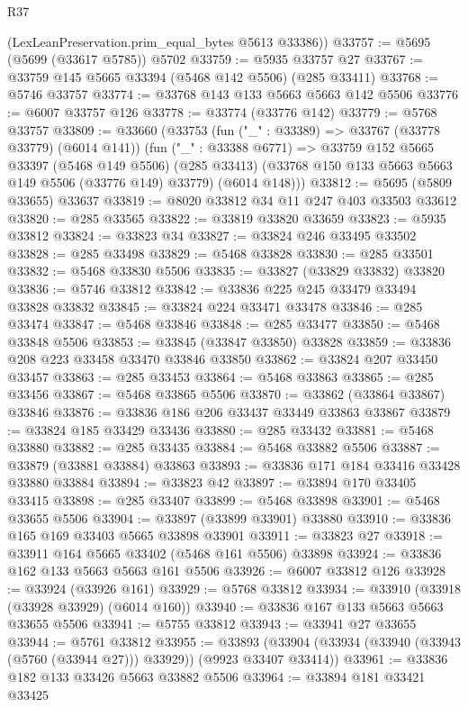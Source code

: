 \begin{lexlean}{R37}
\begin{coremodule}
      (LexLeanPreservation.prim_equal_bytes @5613 @33386))
@33757 := @5695 (@5699 (@33617 @5785)) @5702
@33759 := @5935 @33757 @27
@33767 := @33759 @145 @5665 @33394 (@5468 @142 @5506) (@285 @33411)
@33768 := @5746 @33757
@33774 := @33768 @143 @133 @5663 @5663 @142 @5506
@33776 := @6007 @33757 @126
@33778 := @33774 (@33776 @142)
@33779 := @5768 @33757
@33809 := @33660
    (@33753
      (fun ("_" : @33389) => @33767 (@33778 @33779) (@6014 @141))
      (fun ("_" : @33388 @6771) =>
      @33759
        @152
        @5665
        @33397
        (@5468 @149 @5506)
        (@285 @33413)
        (@33768 @150 @133 @5663 @5663 @149 @5506 (@33776 @149) @33779)
        (@6014 @148)))
@33812 := @5695 (@5809 @33655) @33637
@33819 := @8020 @33812 @34 @11 @247 @403 @33503 @33612
@33820 := @285 @33565
@33822 := @33819 @33820 @33659
@33823 := @5935 @33812
@33824 := @33823 @34
@33827 := @33824 @246 @33495 @33502
@33828 := @285 @33498
@33829 := @5468 @33828
@33830 := @285 @33501
@33832 := @5468 @33830 @5506
@33835 := @33827 (@33829 @33832) @33820
@33836 := @5746 @33812
@33842 := @33836 @225 @245 @33479 @33494 @33828 @33832
@33845 := @33824 @224 @33471 @33478
@33846 := @285 @33474
@33847 := @5468 @33846
@33848 := @285 @33477
@33850 := @5468 @33848 @5506
@33853 := @33845 (@33847 @33850) @33828
@33859 := @33836 @208 @223 @33458 @33470 @33846 @33850
@33862 := @33824 @207 @33450 @33457
@33863 := @285 @33453
@33864 := @5468 @33863
@33865 := @285 @33456
@33867 := @5468 @33865 @5506
@33870 := @33862 (@33864 @33867) @33846
@33876 := @33836 @186 @206 @33437 @33449 @33863 @33867
@33879 := @33824 @185 @33429 @33436
@33880 := @285 @33432
@33881 := @5468 @33880
@33882 := @285 @33435
@33884 := @5468 @33882 @5506
@33887 := @33879 (@33881 @33884) @33863
@33893 := @33836 @171 @184 @33416 @33428 @33880 @33884
@33894 := @33823 @42
@33897 := @33894 @170 @33405 @33415
@33898 := @285 @33407
@33899 := @5468 @33898
@33901 := @5468 @33655 @5506
@33904 := @33897 (@33899 @33901) @33880
@33910 := @33836 @165 @169 @33403 @5665 @33898 @33901
@33911 := @33823 @27
@33918 := @33911 @164 @5665 @33402 (@5468 @161 @5506) @33898
@33924 := @33836 @162 @133 @5663 @5663 @161 @5506
@33926 := @6007 @33812 @126
@33928 := @33924 (@33926 @161)
@33929 := @5768 @33812
@33934 := @33910 (@33918 (@33928 @33929) (@6014 @160))
@33940 := @33836 @167 @133 @5663 @5663 @33655 @5506
@33941 := @5755 @33812
@33943 := @33941 @27 @33655
@33944 := @5761 @33812
@33955 := @33893
    (@33904 (@33934 (@33940 (@33943 (@5760 (@33944 @27))) @33929)) (@9923 @33407 @33414))
@33961 := @33836 @182 @133 @33426 @5663 @33882 @5506
@33964 := @33894 @181 @33421 @33425

\end{coremodule}
\end{lexlean}
